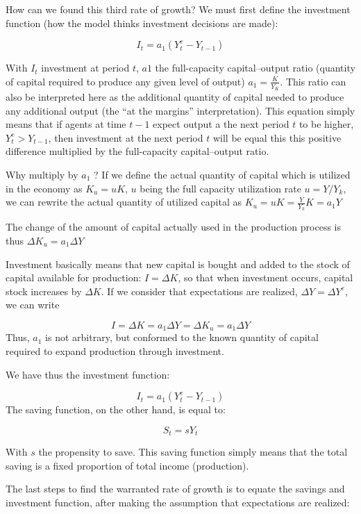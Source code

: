 \documentclass[
  letterpaper,
  DIV=11,
  numbers=noendperiod]{scrreprt}
\begin{document}
How can we found this third rate of growth? We must first define the
investment function (how the model thinks investment decisions are
made):

\[
I_t = a_1(Y^e_t - Y_{t-1})
\]

With \(I_t\) investment at period \(t\), \(a1\) the full-capacity
capital--output ratio (quantity of capital required to produce any given
level of output) \(a_1 = \frac{K}{Y_K}\). This ratio can also be
interpreted here as the additional quantity of capital needed to produce
any additional output (the ``at the margins'' interpretation). This
equation simply means that if agents at time \(t-1\) expect output a the
next period \(t\) to be higher, \(Y^e_t > Y_{t-1}\), then investment at
the next period \(t\) will be equal this this positive difference
multiplied by the full-capacity capital--output ratio.

Why multiply by \(a_1\) ? If we define the actual quantity of capital
which is utilized in the economy as \(K_u = uK\), \(u\) being the full
capacity utilization rate \(u = Y/Y_k\), we can rewrite the actual
quantity of utilized capital as \(K_u = uK = \frac{Y}{Y_k}K = a_1Y\)

The change of the amount of capital actually used in the production
process is thus \(\Delta{K_u} = a_1\Delta{Y}\)

Investment basically means that new capital is bought and added to the
stock of capital available for production: \(I = \Delta{K}\), so that
when investment occurs, capital stock increases by \(\Delta K\). If we
consider that expectations are realized, \(\Delta{Y} = \Delta{Y^e}\), we
can write

\[
I = \Delta K = a_1\Delta Y = \Delta K_u = a_1\Delta{Y}
\] Thus, \(a_1\) is not arbitrary, but conformed to the known quantity
of capital required to expand production through investment.

We have thus the investment function:

\[
I_t = a_1(Y^e_t - Y_{t-1})
\] The saving function, on the other hand, is equal to:

\[
S_t = sY_t
\]

With \(s\) the propensity to save. This saving function simply means
that the total saving is a fixed proportion of total income
(production).

The last steps to find the warranted rate of growth is to equate the
savings and investment function, after making the assumption that
expectations are realized:
\end{document}
